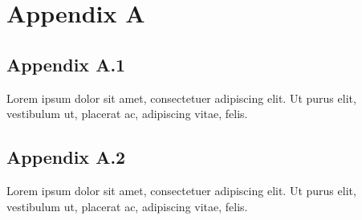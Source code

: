 
\clearpage
\section*{Appendix A}
\label{sec:appendix-a}


\subsection*{Appendix A.1}
\label{sec:appendix-a1}

Lorem ipsum dolor sit amet, consectetuer adipiscing elit. Ut purus elit, vestibulum ut, placerat ac, adipiscing vitae, felis.

\subsection*{Appendix A.2}
\label{sec:appendix-a2}

Lorem ipsum dolor sit amet, consectetuer adipiscing elit. Ut purus elit, vestibulum ut, placerat ac, adipiscing vitae, felis.

